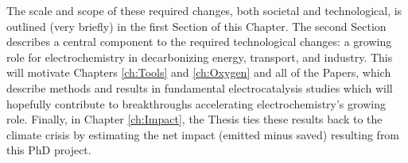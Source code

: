 The scale and scope of these required changes, both societal and technological, is outlined (very briefly) in the first Section of this Chapter. The second Section describes a central component to the required technological changes: a growing role for electrochemistry in decarbonizing energy, transport, and industry. This will motivate Chapters \ref{ch:Tools} and \ref{ch:Oxygen} and all of the Papers, which describe methods and results in fundamental electrocatalysis studies which will hopefully contribute to breakthroughs accelerating electrochemistry's growing role. Finally, in Chapter \ref{ch:Impact}, the Thesis ties these results back to the climate crisis by estimating the net  impact (emitted minus saved) resulting from this PhD project.
